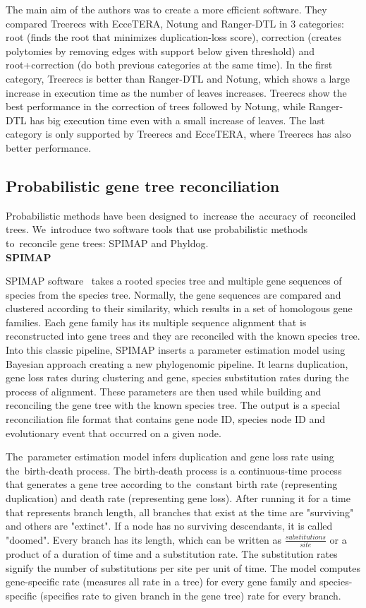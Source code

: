 The main aim of the authors was to create a more efficient software. They compared Treerecs with EcceTERA, Notung and Ranger-DTL in 3 categories: root (finds the root that minimizes duplication-loss score), correction (creates polytomies by removing edges with support below given threshold) and root+correction (do both previous categories at the same time). In the first category, Treerecs is better than Ranger-DTL and Notung, which shows a large increase in execution time as the number of leaves increases. Treerecs show the best performance in the correction of trees followed by Notung, while Ranger-DTL has big execution time even with a small increase of leaves. The last category is only supported by Treerecs and EcceTERA, where Treerecs has also better performance.

\subsection{Probabilistic gene tree reconciliation}
Probabilistic methods have been designed to~increase the~accuracy of~reconciled trees. We~introduce two software tools that use probabilistic methods to~reconcile gene trees: SPIMAP and Phyldog.\\
\textbf{SPIMAP}

SPIMAP software~\cite{spimap_online} takes a rooted species tree and multiple gene sequences of species from the species tree. Normally, the gene sequences are compared and clustered according to their similarity, which results in a set of homologous gene families. Each gene family has its multiple sequence alignment that is reconstructed into gene trees and they are reconciled with the known species tree. Into this classic pipeline, SPIMAP inserts a parameter estimation model using Bayesian approach creating a new phylogenomic pipeline. It learns duplication, gene loss rates during clustering and gene, species substitution rates during the process of alignment. These parameters are then used while building and reconciling the gene tree with the known species tree. The output is a special reconciliation file format that contains gene node ID, species node ID and evolutionary event that occurred on a given node.

The~parameter estimation model \cite{spimap} infers duplication and gene loss rate using the~birth-death process. The birth-death process is a continuous-time process that generates a gene tree according to the~constant birth rate (representing duplication) and death rate (representing gene loss). After running it for a time that represents branch length, all branches that exist at the time are "surviving" and others are "extinct". If a node has no surviving descendants, it is called "doomed". Every branch has its length, which can be written as  \( \frac{substitutions}{site} \) or a product of a duration of time and a substitution rate. The substitution rates signify the number of substitutions per site per unit of time. The model computes gene-specific rate (measures all rate in a tree) for every gene family and species-specific (specifies rate to given branch in the gene tree) rate for every branch.

